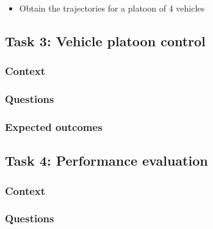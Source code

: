 \documentclass[]{book}
\providecommand{\tightlist}{%
  \setlength{\itemsep}{0pt}\setlength{\parskip}{0pt}}
\theoremstyle{definition}
\theoremstyle{definition}
\theoremstyle{definition}
\theoremstyle{remark}
\begin{document}
\begin{itemize}
\tightlist
\item
  Obtain the trajectories for a platoon of 4 vehicles
\end{itemize}

\hypertarget{task-3-vehicle-platoon-control}{%
\subsection*{Task 3: Vehicle platoon
control}\label{task-3-vehicle-platoon-control}}

\hypertarget{context-7}{%
\subsubsection*{Context}\label{context-7}}

\hypertarget{questions-6}{%
\subsubsection*{Questions}\label{questions-6}}

\hypertarget{expected-outcomes-6}{%
\subsubsection*{Expected outcomes}\label{expected-outcomes-6}}

\hypertarget{task-4-performance-evaluation-1}{%
\subsection*{Task 4: Performance
evaluation}\label{task-4-performance-evaluation-1}}

\hypertarget{context-8}{%
\subsubsection*{Context}\label{context-8}}

\hypertarget{questions-7}{%
\subsubsection*{Questions}\label{questions-7}}
\end{document}
